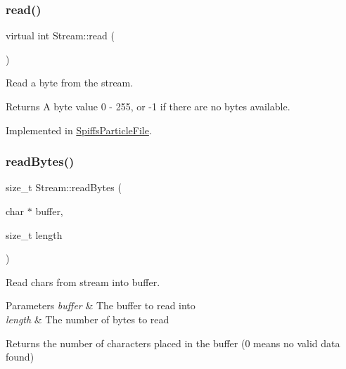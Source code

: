 \mbox{\label{class_stream_aea5dee9fcb038148515b7c9212d38dc0}} 
\subsubsection{\texorpdfstring{read()}{read()}}
{\footnotesize\ttfamily virtual int Stream\+::read (\begin{DoxyParamCaption}{ }\end{DoxyParamCaption})\hspace{0.3cm}{\ttfamily [pure virtual]}}



Read a byte from the stream. 

\begin{DoxyReturn}{Returns}
A byte value 0 -\/ 255, or -\/1 if there are no bytes available. 
\end{DoxyReturn}


Implemented in \mbox{\hyperlink{class_spiffs_particle_file_a00ff81c014bb8373b3031e4b6ea48c16}{Spiffs\+Particle\+File}}.

\mbox{\label{class_stream_a45fd1336a323ea83b16e8507055f44ea}} 
\subsubsection{\texorpdfstring{read\+Bytes()}{readBytes()}}
{\footnotesize\ttfamily size\+\_\+t Stream\+::read\+Bytes (\begin{DoxyParamCaption}\item[{char $\ast$}]{buffer,  }\item[{size\+\_\+t}]{length }\end{DoxyParamCaption})}



Read chars from stream into buffer. 


\begin{DoxyParams}{Parameters}
{\em buffer} & The buffer to read into \\
\hline
{\em length} & The number of bytes to read \\
\hline
\end{DoxyParams}
\begin{DoxyReturn}{Returns}
the number of characters placed in the buffer (0 means no valid data found) 
\end{DoxyReturn}
\mbox{\label{class_stream_af84672a4fb2620466958d3118d4fea00}} 
